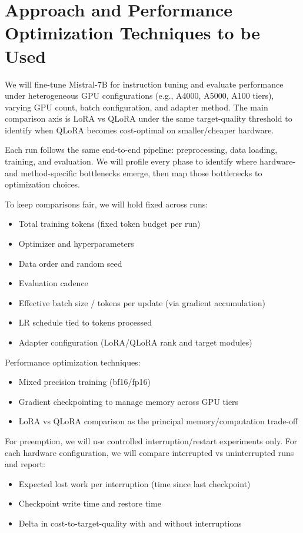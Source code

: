 \documentclass[10pt]{article}
\begin{document}
\section{Approach and Performance Optimization Techniques to be Used}
We will fine-tune Mistral-7B for instruction tuning and evaluate performance under heterogeneous GPU configurations (e.g., A4000, A5000, A100 tiers), varying GPU count, batch configuration, and adapter method. The main comparison axis is LoRA vs QLoRA under the same target-quality threshold to identify when QLoRA becomes cost-optimal on smaller/cheaper hardware.

Each run follows the same end-to-end pipeline: preprocessing, data loading, training, and evaluation. We will profile every phase to identify where hardware- and method-specific bottlenecks emerge, then map those bottlenecks to optimization choices.

To keep comparisons fair, we will hold fixed across runs:
\begin{itemize}
  \item Total training tokens (fixed token budget per run)
  \item Optimizer and hyperparameters
  \item Data order and random seed
  \item Evaluation cadence
  \item Effective batch size / tokens per update (via gradient accumulation)
  \item LR schedule tied to tokens processed
  \item Adapter configuration (LoRA/QLoRA rank and target modules)
\end{itemize}

Performance optimization techniques:
\begin{itemize}
  \item Mixed precision training (bf16/fp16)
  \item Gradient checkpointing to manage memory across GPU tiers
  \item LoRA vs QLoRA comparison as the principal memory/computation trade-off
\end{itemize}

For preemption, we will use controlled interruption/restart experiments only. For each hardware configuration, we will compare interrupted vs uninterrupted runs and report:
\begin{itemize}
  \item Expected lost work per interruption (time since last checkpoint)
  \item Checkpoint write time and restore time
  \item Delta in cost-to-target-quality with and without interruptions
\end{itemize}
\end{document}
